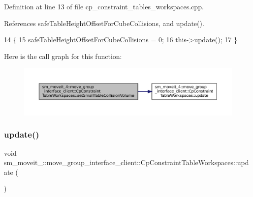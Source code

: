 Definition at line 13 of file cp\+\_\+constraint\+\_\+tables\+\_\+workspaces.\+cpp.



References safe\+Table\+Height\+Offset\+For\+Cube\+Collisions, and update().


\begin{DoxyCode}
14         \{
15             \hyperlink{classsm__moveit__4_1_1move__group__interface__client_1_1CpConstraintTableWorkspaces_a3f9ba91578890ba9a146c678e3630d9f}{safeTableHeightOffsetForCubeCollisions} = 0;
16             this->\hyperlink{classsm__moveit__4_1_1move__group__interface__client_1_1CpConstraintTableWorkspaces_a7d7ed0c25f8d40392a977160ae3123a7}{update}();
17         \}
\end{DoxyCode}
Here is the call graph for this function\+:
\nopagebreak
\begin{figure}[H]
\begin{center}
\leavevmode
\includegraphics[width=350pt]{classsm__moveit__4_1_1move__group__interface__client_1_1CpConstraintTableWorkspaces_a0d343583b5ea3e9bc9df4779fe85d805_cgraph}
\end{center}
\end{figure}
\mbox{\label{classsm__moveit__4_1_1move__group__interface__client_1_1CpConstraintTableWorkspaces_a7d7ed0c25f8d40392a977160ae3123a7}} 
\subsubsection{\texorpdfstring{update()}{update()}}
{\footnotesize\ttfamily void sm\+\_\+moveit\+\_\+::move\+\_\+group\+\_\+interface\+\_\+client\+::\+Cp\+Constraint\+Table\+Workspaces\+::update (\begin{DoxyParamCaption}{ }\end{DoxyParamCaption})\hspace{0.3cm}{\ttfamily [virtual]}}



